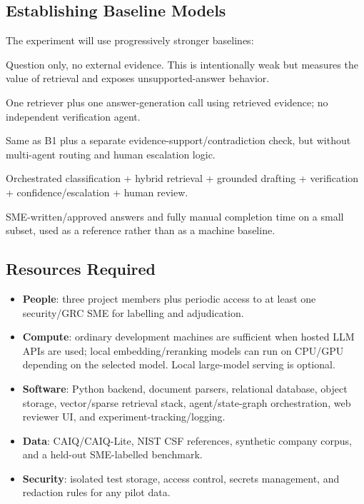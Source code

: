 \documentclass[11pt,journal,onecolumn]{IEEEtran}
\begin{document}
\subsection{Establishing Baseline Models}
The experiment will use progressively stronger baselines:
\begin{description}[leftmargin=2.1cm,style=nextline]
    \item[B0: Direct LLM] Question only, no external evidence. This is intentionally weak but measures the value of retrieval and exposes unsupported-answer behavior.
    \item[B1: Single-agent RAG] One retriever plus one answer-generation call using retrieved evidence; no independent verification agent.
    \item[B2: RAG + verifier] Same as B1 plus a separate evidence-support/contradiction check, but without multi-agent routing and human escalation logic.
    \item[P: Trustilo] Orchestrated classification + hybrid retrieval + grounded drafting + verification + confidence/escalation + human review.
    \item[Human reference] SME-written/approved answers and fully manual completion time on a small subset, used as a reference rather than as a machine baseline.
\end{description}

\subsection{Resources Required}
\begin{itemize}[leftmargin=1.7em]
    \item \textbf{People}: three project members plus periodic access to at least one security/GRC SME for labelling and adjudication.
    \item \textbf{Compute}: ordinary development machines are sufficient when hosted LLM APIs are used; local embedding/reranking models can run on CPU/GPU depending on the selected model. Local large-model serving is optional.
    \item \textbf{Software}: Python backend, document parsers, relational database, object storage, vector/sparse retrieval stack, agent/state-graph orchestration, web reviewer UI, and experiment-tracking/logging.
    \item \textbf{Data}: CAIQ/CAIQ-Lite, NIST CSF references, synthetic company corpus, and a held-out SME-labelled benchmark.
    \item \textbf{Security}: isolated test storage, access control, secrets management, and redaction rules for any pilot data.
\end{itemize}
\end{document}
